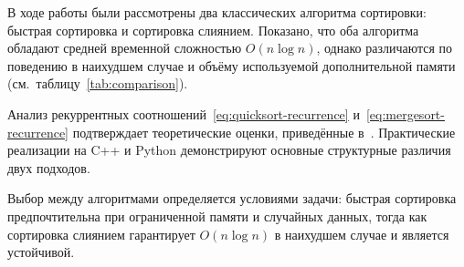 В ходе работы были рассмотрены два классических алгоритма сортировки: быстрая сортировка
и сортировка слиянием. Показано, что оба алгоритма обладают средней временной сложностью
$O(n \log n)$, однако различаются по поведению в наихудшем случае и объёму используемой
дополнительной памяти (см.~таблицу~\ref{tab:comparison}).

Анализ рекуррентных соотношений~\eqref{eq:quicksort-recurrence}
и~\eqref{eq:mergesort-recurrence} подтверждает теоретические оценки, приведённые
в~\cite{cormen2009algorithms,knuth1997art}. Практические реализации на C++ и Python
демонстрируют основные структурные различия двух подходов.

Выбор между алгоритмами определяется условиями задачи: быстрая сортировка предпочтительна
при ограниченной памяти и случайных данных, тогда как сортировка слиянием гарантирует
$O(n \log n)$ в наихудшем случае и является устойчивой.
